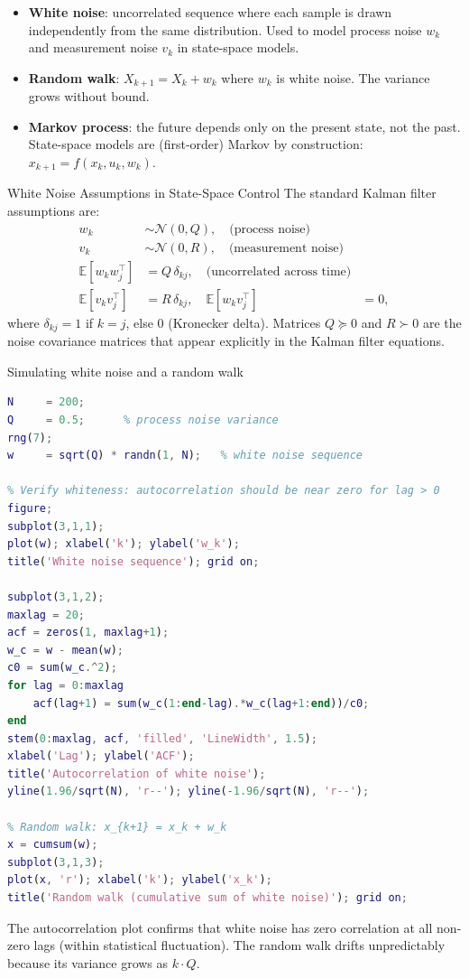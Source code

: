 \begin{itemize}[noitemsep]
  \item \textbf{White noise}: uncorrelated sequence where each sample
        is drawn independently from the same distribution.  Used to
        model process noise $w_k$ and measurement noise $v_k$ in state-space models.
  \item \textbf{Random walk}: $X_{k+1} = X_k + w_k$ where $w_k$ is
        white noise.  The variance grows without bound.
  \item \textbf{Markov process}: the future depends only on the
        present state, not the past.  State-space models are
        (first-order) Markov by construction: $x_{k+1} = f(x_k, u_k, w_k)$.
\end{itemize}

\begin{defnbox}{White Noise Assumptions in State-Space Control}
The standard Kalman filter assumptions are:
\begin{align*}
  w_k &\sim \mathcal{N}(0, Q), \quad
  \text{(process noise)} \\
  v_k &\sim \mathcal{N}(0, R), \quad
  \text{(measurement noise)} \\
  \mathbb{E}[w_k w_j^\top] &= Q\,\delta_{kj}, \quad
  \text{(uncorrelated across time)} \\
  \mathbb{E}[v_k v_j^\top] &= R\,\delta_{kj}, \quad
  \mathbb{E}[w_k v_j^\top] &= 0,
\end{align*}
where $\delta_{kj} = 1$ if $k=j$, else $0$ (Kronecker delta).
Matrices $Q \succeq 0$ and $R \succ 0$ are the noise covariance
matrices that appear explicitly in the Kalman filter equations.
\end{defnbox}

\begin{examplebox}{Simulating white noise and a random walk}
\begin{lstlisting}[language=Matlab]
N     = 200;
Q     = 0.5;      % process noise variance
rng(7);
w     = sqrt(Q) * randn(1, N);   % white noise sequence

% Verify whiteness: autocorrelation should be near zero for lag > 0
figure;
subplot(3,1,1);
plot(w); xlabel('k'); ylabel('w_k');
title('White noise sequence'); grid on;

subplot(3,1,2);
maxlag = 20;
acf = zeros(1, maxlag+1);
w_c = w - mean(w);
c0 = sum(w_c.^2);
for lag = 0:maxlag
    acf(lag+1) = sum(w_c(1:end-lag).*w_c(lag+1:end))/c0;
end
stem(0:maxlag, acf, 'filled', 'LineWidth', 1.5);
xlabel('Lag'); ylabel('ACF');
title('Autocorrelation of white noise');
yline(1.96/sqrt(N), 'r--'); yline(-1.96/sqrt(N), 'r--');

% Random walk: x_{k+1} = x_k + w_k
x = cumsum(w);
subplot(3,1,3);
plot(x, 'r'); xlabel('k'); ylabel('x_k');
title('Random walk (cumulative sum of white noise)'); grid on;
\end{lstlisting}
\solution
The autocorrelation plot confirms that white noise has zero
correlation at all non-zero lags (within statistical fluctuation).
The random walk drifts unpredictably because its variance grows as
$k \cdot Q$.

\end{examplebox}

